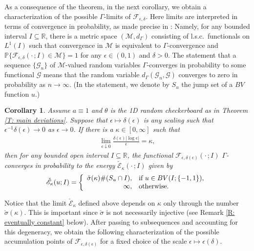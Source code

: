 \documentclass[10pt,a4paper]{amsart}
\newtheorem{corollary}{Corollary}
\begin{document}
As a consequence of the theorem, in the next corollary, we obtain a characterization of the possible $\Gamma$-limits of $\mathscr{F}_{\epsilon,\delta}$.  Here limits are interpreted in terms of convergence in probability, as made precise in \cite{part1}: Namely, for any bounded interval $I \subseteq \mathbb{R}$, there is a metric space $(\mathcal{M},d_{\Gamma})$ consisting of l.s.c.\ functionals on $L^{1}(I)$ such that convergence in $\mathcal{M}$ is equivalent to $\Gamma$-convergence and $\mathbb{P} \{ \mathscr{F}_{\epsilon,\delta}(\cdot \, ; I) \in \mathcal{M} \} = 1$ for any $\epsilon \in (0,1)$ and $\delta > 0$.  The statement that a sequence $\{\mathscr{G}_{n}\}$ of $\mathcal{M}$-valued random variables $\Gamma$-converges in probability to some functional $\mathscr{G}$ means that the random variable $d_{\Gamma}(\mathscr{G}_{n},\mathscr{G})$ converges to zero in probability as $n \to \infty$.   (In the statement, we denote by $S_{u}$ the jump set of a $BV$ function $u$.)

\begin{corollary} \label{C: gamma limits} Assume $a \equiv 1$ and $\theta$ is the 1D random checkerboard as in Theorem \ref{T: main deviations}.  Suppose that $\epsilon \mapsto \delta(\epsilon)$ is any scaling such that $\epsilon^{-1} \delta(\epsilon) \to 0$ as $\epsilon \to 0$.  If there is a $\kappa \in [0,\infty]$ such that
    \begin{align} \label{E: limit corollary}
        \lim_{ \epsilon \downarrow 0 } \frac{ \delta(\epsilon) | \log \epsilon | }{ \epsilon } = \kappa , 
    \end{align}
then for any bounded open interval $I \subseteq \mathbb{R}$, the functional $\mathscr{F}_{\epsilon,\delta(\epsilon)}(\cdot \, ; I)$ $\Gamma$-converges in probability to the energy $\check{\mathscr{E}}_{\kappa}(\cdot \, ;I)$ given by
    \begin{align*}
        \check{\mathscr{E}}_{\kappa}(u;I) = \left\{ \begin{array}{r l}
            \check{\sigma}(\kappa) \# ( S_{u} \cap I ), & \text{if} \, \, u \in BV(I; \{-1,1\}), \\ \infty, & \text{otherwise.}
        \end{array} \right.
    \end{align*}
\end{corollary}

Notice that the limit $\check{\mathscr{E}}_{\kappa}$ defined above depends on $\kappa$ only through the number $\check{\sigma}(\kappa)$.  This is important since $\check{\sigma}$ is not necessarily injective (see Remark \ref{R: eventually constant} below).  After passing to subsequences and accounting for this degeneracy, we obtain the following characterization of the possible accumulation points of $\mathscr{F}_{\epsilon,\delta(\epsilon)}$ for a fixed choice of the scale $\epsilon \mapsto \epsilon(\delta)$.
\end{document}
